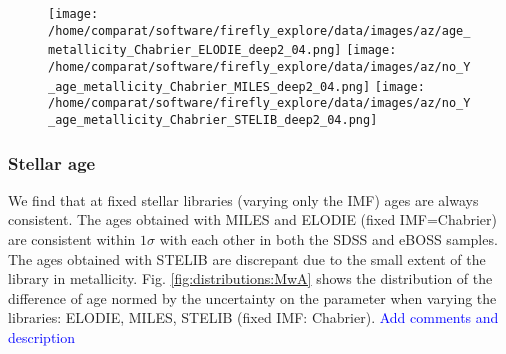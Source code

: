 \documentclass[onecolumn]{aa}
\begin{document}
\begin{figure}
\begin{center}
\texttt{[image: /home/comparat/software/firefly\_explore/data/images/az/age\_metallicity\_Chabrier\_ELODIE\_deep2\_04.png]}
\hspace*{-1.78cm}
\texttt{[image: /home/comparat/software/firefly\_explore/data/images/az/no\_Y\_age\_metallicity\_Chabrier\_MILES\_deep2\_04.png]}
\hspace*{-1.78cm}
\texttt{[image: /home/comparat/software/firefly\_explore/data/images/az/no\_Y\_age\_metallicity\_Chabrier\_STELIB\_deep2\_04.png]}
\end{center}
\end{figure}
% 


\subsubsection{Stellar age}
\label{subsec:res:age}

We find that at fixed stellar libraries (varying only the IMF) ages are always consistent. 
The ages obtained with MILES and ELODIE (fixed IMF=Chabrier) are consistent within $1\sigma$ with each other in both the SDSS and eBOSS samples.
The ages obtained with STELIB are discrepant due to the small extent of the library in metallicity. 
Fig. \ref{fig:distributions:MwA} shows the distribution of the difference of age normed by the uncertainty on the parameter when varying the libraries: ELODIE, MILES, STELIB (fixed IMF: Chabrier).
\textcolor{blue}{Add comments and description}
\end{document}
